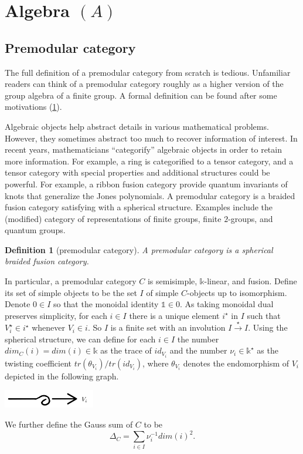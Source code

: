 \documentclass[12pt]{extarticle}
\numberwithin{equation}{section} %
\theoremstyle{mystyle}
\newtheorem{definition}[equation]{Definition}
\begin{document}
\section{Algebra $(A)$}\label{section/algebra}
\subsection{Premodular category}

The full definition of a premodular category from scratch is
tedious. Unfamiliar readers can think of a premodular category
roughly as a higher version of the group algebra of a finite
group. A formal definition can be found after some motivations
(\ref{def/premodular-category}).

Algebraic objects help abstract details in various mathematical
problems. However, they sometimes abstract too much to recover
information of interest. In recent years, mathematicians
``categorify'' algebraic objects in order to retain more
information. For example, a ring is categorified to a tensor
category, and a tensor category with special properties and
additional structures could be powerful. For example, a ribbon
fusion category provide quantum invariants of knots that
generalize the Jones polynomials. A premodular category is a
braided fusion category satisfying with a spherical structure.
Examples include the (modified) category of representations of
finite groups, finite $2$-groups, and quantum groups.

\begin{definition}[premodular category]\label{def/premodular-category}
  A premodular category is a spherical braided fusion category.
\end{definition}

\noindent In particular, a premodular category $C$ is semisimple,
$\mathbb{k}$-linear, and fusion. Define its set of simple objects to be
the set $I$ of simple $C$-objects up to isomorphism. Denote
$0 \in I$ so that the monoidal identity $\mathbb{1} \in 0$. As
taking monoidal dual preserves simplicity, for each $i \in I$
there is a unique element $i^{\star}$ in $I$ such that
$V_{i}^{\star} \in i^{\star}$ whenever $V_{i} \in i$. So $I$ is a
finite set with an involution $I \xrightarrow{\star} I$. Using
the spherical structure, we can define for each $i \in I$ the
number $dim_{C}(i) = dim(i) \in \mathbb{k}$ as the trace of
$id_{V_{i}}$ and the number $\nu_{i} \in \mathbb{k}^{\star}$ as
the twisting coefficient $tr(\theta_{V_{i}})/tr(id_{V_{i}})$,
where $\theta_{V_{i}}$ denotes the endomorphism of $V_{i}$
depicted in the following graph.
\begin{center}
  \includegraphics[height=0.8cm]{twist}
\end{center}
We further define the Gauss sum of $C$ to be
$$\Delta_{C} = \sum_{i \in I} \nu_{i}^{-1}dim(i)^{2}.$$
\end{document}
